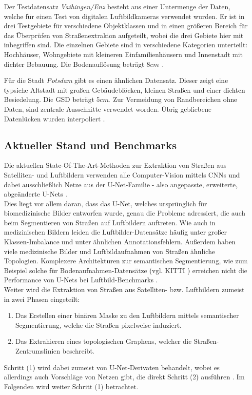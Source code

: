 Der Testdatensatz \textit{Vaihingen/Enz} besteht aus einer Untermenge der Daten, welche für einen Test von digitalen Luftbildkameras verwendet wurden.
Er ist in drei Testgebiete für verschiedene Objektklassen und in einen größeren Bereich für das Überprüfen von Straßenextrakion aufgeteilt, wobei die drei Gebiete hier mit inbegriffen sind.
Die einzelnen Gebiete sind in verschiedene Kategorien unterteilt: Hochhäuser, Wohngebiete mit kleineren Einfamilienhäusern und Innenstadt mit dichter Bebauung.
Die Bodenauflösung beträgt $8cm$ \cite{Englich.06.10.2022b}.

Für die Stadt \textit{Potsdam} gibt es einen ähnlichen Datensatz. 
Dieser zeigt eine typsiche Altstadt mit großen Gebäudeblöcken, kleinen Straßen und einer dichten Besiedelung.
Die \ac{GSD} beträgt $5cm$.
Zur Vermeidung von Randbereichen ohne Daten, sind zentrale Ausschnitte verwendet worden.
Übrig gebliebene Datenlücken wurden interpoliert \cite{Englich.17.11.2022, Englich.17.11.2022b}.

\subsection{Aktueller Stand und Benchmarks} \label{sec:state-of-the-art-roads} %

Die aktuellen State-Of-The-Art-Methoden zur Extraktion von Straßen aus Satelliten- und Luftbildern verwenden 
alle Computer-Vision mittels \acp{CNN} und dabei ausschließlich Netze aus der U-Net-Familie - also angepasste, 
erweiterte, abgeänderte U-Nets \cites{C.Henry.2021, Constantin.2018, Kamiya.2018, Yerram.2022}. \\
Dies liegt vor allem daran, dass das U-Net, welches ursprünglich für biomedizinische Bilder entworfen wurde, 
genau die Probleme adressiert, die auch beim Segmentieren von Straßen auf Luftbildern auftreten. 
Wie auch in medizinischen Bildern leiden die Luftbilder-Datensätze häufig unter großer Klassen-Imbalance 
und unter ähnlichen Annotationsfehlern. Außerdem haben viele medizinische Bilder und Luftbildaufnahmen von Straßen 
ähnliche Topologien. Komplexere Architekturen zur semantischen Segmentierung, wie zum Beispiel solche 
für Bodenaufnahmen-Datensätze (vgl. KITTI \cite{Geiger.2013}) erreichen nicht die Performance von U-Nets bei 
Luftbild-Benchmarks \cite{C.Henry.2021}. \\
Weiter wird die Extraktion von Straßen aus Satelliten- bzw. Luftbildern zumeist in zwei Phasen eingeteilt: 
\begin{enumerate}
	\item Das Erstellen einer binären Maske zu den Luftbildern mittels semantischer Segmentierung, 
	welche die Straßen pixelweise induziert. 
	\item Das Extrahieren eines topologischen Graphens, welcher die Straßen-Zentrumslinien beschreibt.   
\end{enumerate}
Schritt (1) wird dabei zumeist von U-Net-Derivaten behandelt, wobei es allerdings auch Vorschläge von Netzen gibt, 
die direkt Schritt (2) ausführen \cite{C.Henry.2021}.
Im Folgenden wird weiter Schritt (1) betrachtet.   

